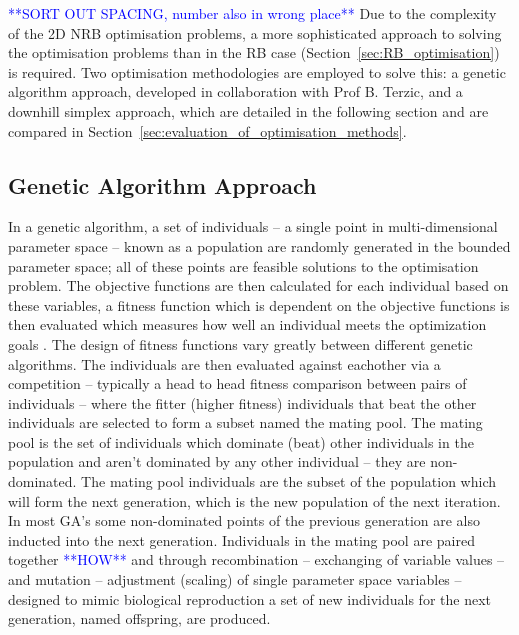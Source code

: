 \documentclass[../main.tex]{subfiles}
\begin{document}
\textcolor{blue}{**SORT OUT SPACING, number also in wrong place**}
Due to the complexity of the 2D NRB optimisation problems, a more sophisticated approach  to solving the optimisation problems than in the RB case (Section~\ref{sec:RB_optimisation}) is required. Two optimisation methodologies are employed to solve this: a genetic algorithm approach, developed in collaboration with Prof B. Terzic, and a downhill simplex approach, which are detailed in the following section and are compared in Section~\ref{sec:evaluation_of_optimisation_methods}.

\subsection{Genetic Algorithm Approach}

In a genetic algorithm, a set of individuals -- a single point in multi-dimensional parameter space -- known as a population are randomly generated in the bounded parameter space; all of these points are feasible solutions to the optimisation problem. The objective functions are then calculated for each individual based on these variables, a fitness function which is dependent on the objective functions is then evaluated which measures how well an individual meets the optimization goals \cite{hofler2013innovative}. The design of fitness functions vary greatly between different genetic algorithms. The individuals are then evaluated against eachother via a competition -- typically a head to head fitness comparison between pairs of individuals -- where the fitter (higher fitness) individuals that beat the other individuals are selected to form a subset named the mating pool. The mating pool is the set of individuals which dominate (beat) other individuals in the population and aren't dominated by any other individual -- they are non-dominated. The mating pool individuals are the subset of the population which will form the next generation, which is the new population of the next iteration. In most GA's some non-dominated points of the previous generation are also inducted into the next generation. Individuals in the mating pool are paired together \textcolor{blue}{**HOW**} and through recombination -- exchanging of variable values -- and mutation -- adjustment (scaling) of single parameter space variables \cite{hofler2013innovative} -- designed to mimic biological reproduction a set of new individuals for the next generation, named offspring, are produced.
\end{document}
